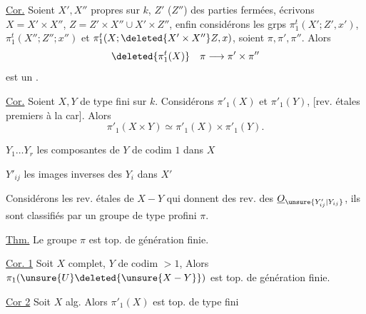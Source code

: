 \uline{Cor.} Soient $X',X''$ propres sur $k$,
$Z'$ ($Z''$) des parties fermées,  écrivons
$X=X'\times X''$, $Z=Z'\times X''\cup X'\times Z''$,
enfin considérons les grps
$\pi_1^t(X';Z',x')$, $\pi_1^t(X'';Z'';x'')$ et
$\pi_1^t(X;\deleted{X'\times X''}Z,x)$,
 soient $\pi,\pi',\pi''$.
Alors
\[
\deleted{\pi_1^t(X)}\quad \pi\longrightarrow\pi'\times\pi''
\]
est un \uline{}.

\uline{Cor.} Soient $X,Y$ de type fini sur $k$.
Considérons $\pi'_1(X)$ et $\pi'_1(Y)$,
[rev. étales premiers à la car].
Alors
\[
\pi'_1(X\times Y)\simeq\pi'_1(X)\times\pi'_1(Y).
\]

$Y_1\ldots Y_r$ les composantes de $Y$ de codim $1$ dans $X$

$Y'_{ij}$ les images inverses des $Y_i$ dans $X'$

Considérons les rev. étales de $X-Y$ qui
donnent des rev.  des $\underline O_{\unsure{Y'_{ij}|Y_{ij}}}$,
ils sont classifiés par un groupe de type profini $\pi$.

\uline{Thm.} Le groupe $\pi$ est top. de génération finie.

\uline{Cor. 1} Soit $X$  complet,
$Y$ de codim $>1$, 
Alors $\pi_1(\unsure{U}\deleted{\unsure{X-Y}})$
est top. de génération finie.

\uline{Cor 2} Soit $X$  alg.
Alors $\pi'_1(X)$ est top. de type fini



